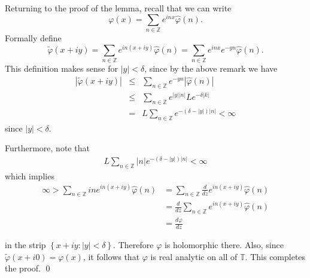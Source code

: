 \documentclass{beamer}
\numberwithin{equation}{section}
\newcommand{\ci}{\mathbb{T}}
\newcommand{\wh}{\widehat}
\newcommand{\vp}{\varphi}
\begin{document}
\begin{frame}
Returning to the proof of the lemma, recall that we can write
\[\varphi(x)=\sum_{n\in \mathbb{Z}}e^{inx}\hat{\varphi}(n).\]
Formally define 
\[\tilde{\varphi}(x+iy)=\sum_{n\in \mathbb{Z}}e^{in(x+iy)}\hat{\varphi}(n)
=\sum_{n\in \mathbb{Z}}e^{inx}e^{-yn}\hat{\varphi}(n).\]
%
%
This definition makes sense for $|y|< \delta$, since by the above remark we have
\begin{eqnarray*}
|\tilde{\varphi}(x+iy)|&\le& \sum_{n\in \mathbb{Z}}e^{-yn}|\hat{\varphi}(n)|
\\
&\le& 
\sum_{n\in \mathbb{Z}}e^{|y| |n|}L e^{-\delta |k|}\\
&=&L \sum_{n\in \mathbb{Z}}e^{-(\delta -|y|) |n|}< \infty
\end{eqnarray*} 
since $|y|< \delta$. 
\end{frame}
\begin{frame}
Furthermore, note that
%
%
\begin{equation*}
\begin{split}
  L \sum_{n \in \mathbb{Z}}| n | e^{-(\delta -|y|) |n|}< \infty
\end{split}
\end{equation*}
%
which implies
\begin{equation*}
\begin{split}
  \infty > \sum_{n \in \mathbb{Z}} i n  e^{in(x + iy)}  \wh{\vp}(n) 
  & = \sum_{n \in \mathbb{Z}} \frac{d}{dz}  e^{in(x + iy)}  \wh{\vp}(n) 
  \\
  & = \frac{d}{dz}\sum_{n \in \mathbb{Z}} e^{in(x + iy)}  \wh{\vp}(n) 
  \\
  & = \frac{d \vp}{dz}
\end{split}
\end{equation*}

%
in the strip $\left\{ x+ iy: | y | < \delta \right\}$. Therefore $\vp$ is
holomorphic there. Also, since $\tilde{\varphi}(x+i0)=\varphi(x)$,
it follows that $\vp$ is real analytic on all of $\ci$.
This completes the proof. \qed
\end{frame}
\end{document}
